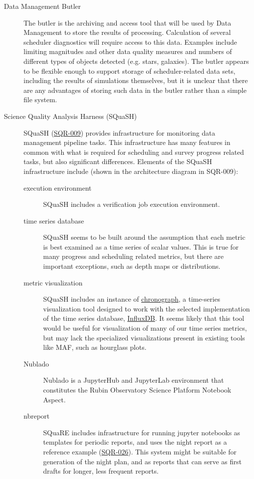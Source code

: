 \begin{description}
\item[{Data Management Butler}] The butler is the archiving and access tool that will be used by Data Management to store the results of processing. Calculation of several scheduler diagnostics will require access to this data. Examples include limiting magnitudes and other data quality measures and numbers of different types of objects detected (e.g. stars, galaxies). The butler appears to be flexible enough to support storage of scheduler-related data sets, including the results of simulations themselves, but it is unclear that there are any advantages of storing such data in the butler rather than a simple file system.
\item[{Science Quality Analysis Harness (SQuaSH)}] SQuaSH (\href{https://sqr-009.lsst.io/}{SQR-009}) provides infrastructure for monitoring data management pipeline tasks. This infrastructure has many features in common with what is required for scheduling and survey progress related tasks, but also significant differences. Elements of the SQuaSH infrastructure include (shown in the architecture diagram in SQR-009):
\begin{description}
\item[{execution environment}] SQuaSH includes a verification job execution environment.
\item[{time series database}] SQuaSH seems to be built around the assumption that each metric is best examined as a time series of scalar values. This is true for many progress and scheduling related metrics, but there are important exceptions, such as depth maps or distributions.
\item[{metric visualization}] SQuaSH includes an instance of \href{https://docs.influxdata.com/chronograf/v1.8/}{chronograph}, a time-series visualization tool designed to work with the selected implementation of the time series database, \href{https://www.influxdata.com/products/influxdb/}{InfluxDB}. It seems likely that this tool would be useful for visualization of many of our time series metrics, but may lack the specialized visualizations present in existing tools like MAF, such as hourglass plots.
\item[{Nublado}] Nublado is a JupyterHub and JupyterLab environment that constitutes the Rubin Observatory Science Platform Notebook Aspect.
\item[{nbreport}] SQuaRE includes infrastructure for running jupyter notebooks as templates for periodic reports, and uses the night report as a reference example (\href{https://sqr-026.lsst.io/}{SQR-026}). This system might be suitable for generation of the night plan, and as reports that can serve as first drafts for longer, less frequent reports.

\end{description}
\end{description}
